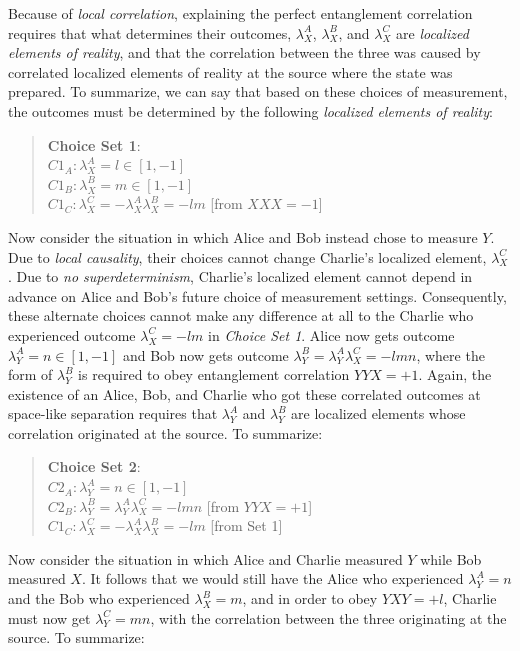 \documentclass[12pt]{article}
\begin{document}
Because of \textit{local correlation}, explaining the perfect entanglement correlation requires that what determines their outcomes, $\lambda_X^A$, $\lambda_X^B$, and $\lambda_X^C$ are \textit{localized elements of reality}, and that the correlation between the three was caused by correlated localized elements of reality at the source where the state was prepared.  To summarize, we can say that based on these choices of measurement, the outcomes must be determined by the following \textit{localized elements of reality}:

\begin{quote}
\textbf{Choice Set 1}:\\
$C1_A: \lambda_X^A = l \in [1,-1]$\\
$C1_B: \lambda_X^B = m \in [1,-1]$\\ 
$C1_C: \lambda_X^C = -\lambda_X^A \lambda_X^B = -lm$ [from $XXX=-1$]
\end{quote}

Now consider the situation in which Alice and Bob instead chose to measure $Y$. Due to \textit{local causality}, their choices cannot change Charlie's localized element, $\lambda_X^C$. Due to \textit{no superdeterminism}, Charlie's localized element cannot depend in advance on Alice and Bob's future choice of measurement settings. Consequently, these alternate choices cannot make any difference at all to the Charlie who experienced outcome $\lambda_X^C = -lm$ in \textit{Choice Set 1}. Alice now gets outcome $\lambda_Y^A = n \in [1,-1]$ and Bob now gets outcome $\lambda_Y^B = \lambda_Y^A \lambda_X^C = -lmn$, where the form of $\lambda_Y^B$ is required to obey entanglement correlation $YYX = +1$. Again, the existence of an Alice, Bob, and Charlie who got these correlated outcomes at space-like separation requires that $\lambda_Y^A$ and $\lambda_Y^B$ are localized elements whose correlation originated at the source. To summarize:

\begin{quote}
\textbf{Choice Set 2}:\\
$C2_A: \lambda_Y^A = n \in [1,-1]$\\
$C2_B: \lambda_Y^B = \lambda_Y^A \lambda_X^C = -lmn$ [from $YYX = +1$]\\ 
$C1_C: \lambda_X^C = -\lambda_X^A \lambda_X^B = -lm$ [from Set 1]
\end{quote}

Now consider the situation in which Alice and Charlie measured $Y$ while Bob measured $X$. It follows that we would still have the Alice who experienced $\lambda_Y^A = n$ and the Bob who experienced $\lambda_X^B = m$, and in order to obey $YXY = +l$, Charlie must now get $\lambda_Y^C = mn$, with the correlation between the three originating at the source.  To summarize:
\end{document}
